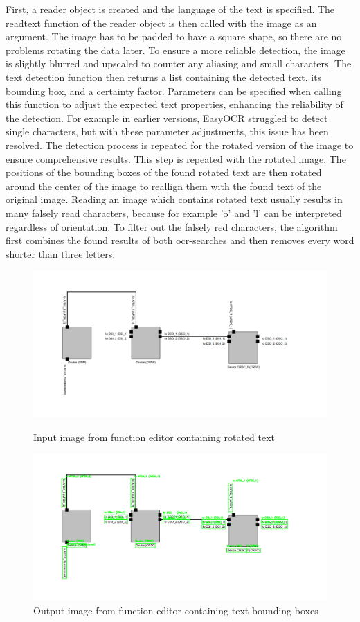 First, a reader object is created and the language of the text is specified. The readtext function of the reader object is then called with the image as an argument. The image has to be padded to have a square shape, so there are no problems rotating the data later. To ensure a more reliable detection, the image is slightly blurred and upscaled to counter any aliasing and small characters. The text detection function then returns a list containing the detected text, its bounding box, and a certainty factor. Parameters can be specified when calling this function to adjust the expected text properties, enhancing the reliability of the detection. For example in earlier versions, EasyOCR struggled to detect single characters, but with these parameter adjustments, this issue has been resolved. The detection process is repeated for the rotated version of the image to ensure comprehensive results. This step is repeated with the rotated image. The positions of the bounding boxes of the found rotated text are then rotated around the center of the image to reallign them with the found text of the original image. Reading an image which contains rotated text usually results in many falsely read characters, because for example 'o' and 'l' can be interpreted regardless of orientation. To filter out the falsely red characters, the algorithm first combines the found results of both ocr-searches and then removes every word shorter than three letters.
\begin{figure}[htb]
    \centering
    \includegraphics[width=0.8\linewidth]{Pictures/text_before.png}
    \caption{Input image from function editor containing rotated text}
    \label{fig_text_before}

    \centering
    \includegraphics[width=0.8\linewidth]{Pictures/text_after.png}
    \caption{Output image from function editor containing text bounding boxes}
    \label{fig_text_after}
\end{figure}
